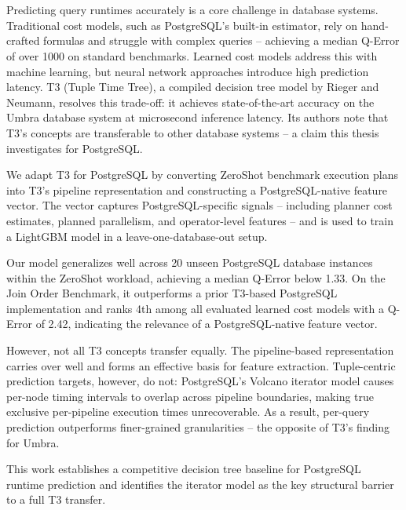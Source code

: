 \chapter{\abstractname}

Predicting query runtimes accurately is a core challenge in database systems.
Traditional cost models, such as PostgreSQL's built-in estimator, rely on hand-crafted formulas and struggle with complex queries -- achieving a median Q-Error of over 1000 on standard benchmarks.
Learned cost models address this with machine learning, but neural network approaches introduce high prediction latency.
T3 (Tuple Time Tree), a compiled decision tree model by Rieger and Neumann, resolves this trade-off: it achieves state-of-the-art accuracy on the Umbra database system at microsecond inference latency.
Its authors note that T3's concepts are transferable to other database systems -- a claim this thesis investigates for PostgreSQL.

We adapt T3 for PostgreSQL by converting ZeroShot benchmark execution plans into T3's pipeline representation and constructing a PostgreSQL-native feature vector.
The vector captures PostgreSQL-specific signals -- including planner cost estimates, planned parallelism, and operator-level features -- and is used to train a LightGBM model in a leave-one-database-out setup.

Our model generalizes well across 20 unseen PostgreSQL database instances within the ZeroShot workload, achieving a median Q-Error below 1.33.
On the Join Order Benchmark, it outperforms a prior T3-based PostgreSQL implementation and ranks 4th among all evaluated learned cost models with a Q-Error of 2.42, indicating the relevance of a PostgreSQL-native feature vector.

However, not all T3 concepts transfer equally.
The pipeline-based representation carries over well and forms an effective basis for feature extraction.
Tuple-centric prediction targets, however, do not: PostgreSQL's Volcano iterator model causes per-node timing intervals to overlap across pipeline boundaries, making true exclusive per-pipeline execution times unrecoverable.
As a result, per-query prediction outperforms finer-grained granularities -- the opposite of T3's finding for Umbra.

This work establishes a competitive decision tree baseline for PostgreSQL runtime prediction and identifies the iterator model as the key structural barrier to a full T3 transfer.
